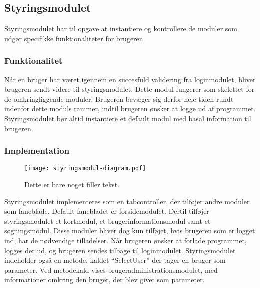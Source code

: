 \subsection{Styringsmodulet}
\label{sub:styringsmodul}

Styringsmodulet har til opgave at instantiere og kontrollere de moduler som udgør specifikke funktionaliteter for brugeren.

\subsubsection{Funktionalitet}
\label{ssub:hovedmodul_funktionalitet}

Når en bruger har været igennem en succesfuld validering fra loginmodulet, bliver brugeren sendt videre til styringsmodulet. Dette modul fungerer som skelettet for de omkringliggende moduler. Brugeren bevæger sig derfor hele tiden rundt indenfor dette moduls rammer, indtil brugeren ønsker at logge ud af programmet. Styringsmodulet bør altid instantiere et default modul med basal information til brugeren.

\subsubsection{Implementation}
\label{ssub:hovedmodul_implementation}

\begin{figure}
  \centering
  \texttt{[image: styringsmodul-diagram.pdf]}
  \caption{Dette er bare noget filler tekst.}
\end{figure}

Styringsmodulet implementeres som en tabcontroller, der tilføjer andre moduler som faneblade. Default fanebladet er forsidemodulet. Dertil tilføjer styringsmodulet et kortmodul, et brugerinformationsmodul samt et søgningsmodul. Disse moduler bliver dog kun tilføjet, hvis brugeren som er logget ind, har de nødvendige tilladelser. Når brugeren ønsker at forlade programmet, logges der ud, og brugeren sendes tilbage til loginmodulet. Styringsmodulet indeholder også en metode, kaldet \enquote{SelectUser} der tager en bruger som parameter. Ved metodekald vises brugeradministrationsmodulet, med informationer omkring den bruger, der blev givet som parameter. 